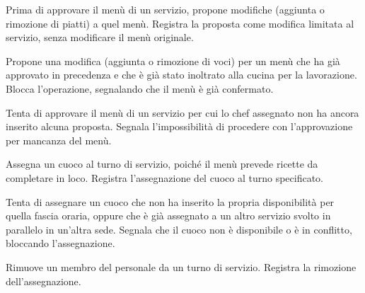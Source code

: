 
\uctablebegin
    {Prima di approvare il menù di un servizio, propone modifiche
     (aggiunta o rimozione di piatti) a quel menù.}
    {Registra la proposta come modifica limitata al servizio, senza
     modificare il menù originale.}
\uctableend


\uctablebegin
    {Propone una modifica (aggiunta o rimozione di voci) per un menù
     che ha già approvato in precedenza e che è già stato inoltrato
     alla cucina per la lavorazione.}
    {Blocca l'operazione, segnalando che il menù è già confermato.}
\uctableend


\uctablebegin
    {Tenta di approvare il menù di un servizio per cui lo chef
     assegnato non ha ancora inserito alcuna proposta.}
    {Segnala l'impossibilità di procedere con l'approvazione per
     mancanza del menù.}
\uctableend


\uctablebegin
    {Assegna un cuoco al turno di servizio, poiché il menù prevede ricette da
     completare in loco.}
    {Registra l'assegnazione del cuoco al turno specificato.}
\uctableend


\uctablebegin
    {Tenta di assegnare un cuoco che non ha inserito la propria
     disponibilità per quella fascia oraria, oppure che è già assegnato
     a un altro servizio svolto in parallelo in un'altra sede.}
    {Segnala che il cuoco non è disponibile o è in conflitto, bloccando
     l'assegnazione.}
\uctableend


\uctablebegin
    {Rimuove un membro del personale da un turno di servizio.}
    {Registra la rimozione dell'assegnazione.}
\uctableend


